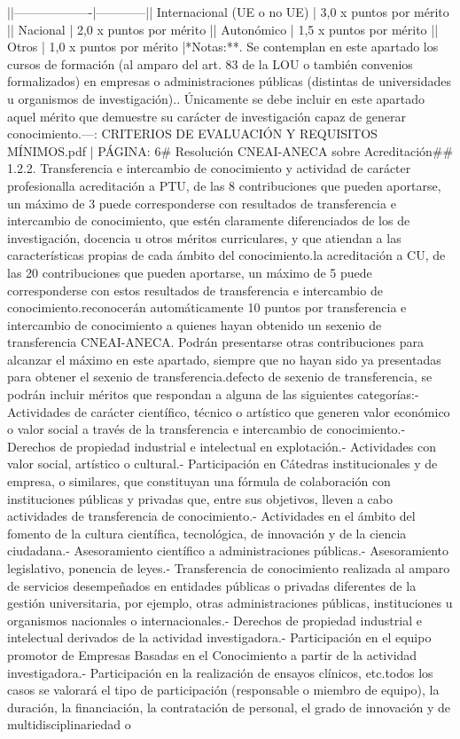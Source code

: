 \documentclass{article}
\begin{document}
\begin{itemize}
{{{{{{|\n|-------------------|------------|\n| Internacional (UE o no UE) | 3,0 x puntos por mérito |\n| Nacional           | 2,0 x puntos por mérito |\n| Autonómico        | 1,5 x puntos por mérito |\n| Otros             | 1,0 x puntos por mérito |\n\n**Notas:**. Se contemplan en este apartado los cursos de formación (al amparo del art. 83 de la LOU o también convenios formalizados) en empresas o administraciones públicas (distintas de universidades u organismos de investigación).. Únicamente se debe incluir en este apartado aquel mérito que demuestre su carácter de investigación capaz de generar conocimiento.\n\n---\n\nFUENTE: CRITERIOS DE EVALUACIÓN Y REQUISITOS MÍNIMOS.pdf | PÁGINA: 6\n# Resolución CNEAI-ANECA sobre Acreditación\n\n## 1.2.2. Transferencia e intercambio de conocimiento y actividad de carácter profesional\n\nPara la acreditación a PTU, de las 8 contribuciones que pueden aportarse, un máximo de 3 puede corresponderse con resultados de transferencia e intercambio de conocimiento, que estén claramente diferenciados de los de investigación, docencia u otros méritos curriculares, y que atiendan a las características propias de cada ámbito del conocimiento.\n\nPara la acreditación a CU, de las 20 contribuciones que pueden aportarse, un máximo de 5 puede corresponderse con estos resultados de transferencia e intercambio de conocimiento.\n\nSe reconocerán automáticamente 10 puntos por transferencia e intercambio de conocimiento a quienes hayan obtenido un sexenio de transferencia CNEAI-ANECA. Podrán presentarse otras contribuciones para alcanzar el máximo en este apartado, siempre que no hayan sido ya presentadas para obtener el sexenio de transferencia.\n\nEn defecto de sexenio de transferencia, se podrán incluir méritos que respondan a alguna de las siguientes categorías:\n- Actividades de carácter científico, técnico o artístico que generen valor económico o valor social a través de la transferencia e intercambio de conocimiento.\n- Derechos de propiedad industrial e intelectual en explotación.\n- Actividades con valor social, artístico o cultural.\n- Participación en Cátedras institucionales y de empresa, o similares, que constituyan una fórmula de colaboración con instituciones públicas y privadas que, entre sus objetivos, lleven a cabo actividades de transferencia de conocimiento.\n- Actividades en el ámbito del fomento de la cultura científica, tecnológica, de innovación y de la ciencia ciudadana.\n- Asesoramiento científico a administraciones públicas.\n- Asesoramiento legislativo, ponencia de leyes.\n- Transferencia de conocimiento realizada al amparo de servicios desempeñados en entidades públicas o privadas diferentes de la gestión universitaria, por ejemplo, otras administraciones públicas, instituciones u organismos nacionales o internacionales.\n- Derechos de propiedad industrial e intelectual derivados de la actividad investigadora.\n- Participación en el equipo promotor de Empresas Basadas en el Conocimiento a partir de la actividad investigadora.\n- Participación en la realización de ensayos clínicos, etc.\n\nEn todos los casos se valorará el tipo de participación (responsable o miembro de equipo), la duración, la financiación, la contratación de personal, el grado de innovación y de multidisciplinariedad o }}}}}}
\end{itemize}
\end{document}
